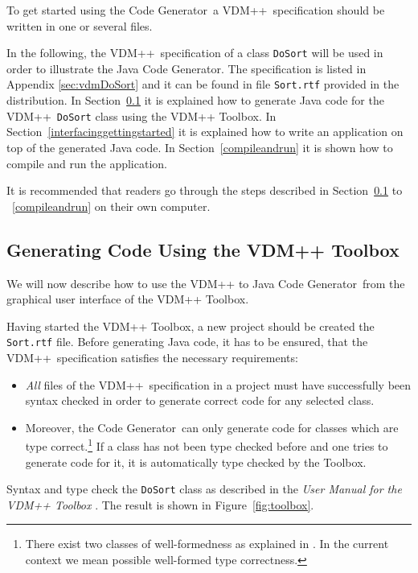 \documentclass[\pformat,11pt]{article}
\newcommand{\ToolboxName}{VDM++ Toolbox}
\newcommand{\Toolbox}{Toolbox}
\newcommand{\tcg}{the Code Generator}
\newcommand{\langmancite}{\cite{LangManPP-SCSK}}
\newcommand{\VDM}{VDM++}
\newcommand{\cg}{VDM++ to Java Code Generator}
\begin{document}
To get started using \tcg\ a \VDM\ specification should be written in
one or several files. 

In the following, the \VDM\ specification of a class {\tt DoSort} will
be used in order to illustrate the Java Code Generator.  The
specification is listed in Appendix \ref{sec:vdmDoSort} and it can be
found in file {\tt Sort.rtf} provided in the distribution. 
In Section~\ref{gui} it is explained how to generate Java code for the
\VDM\ {\tt DoSort} class using the \ToolboxName{}. In
Section~\ref{interfacinggettingstarted} it is explained how to
write an application on top of the generated Java code. In
Section~\ref{compileandrun} it is shown how to compile and run
the application. 

It is recommended that readers go through the steps described in
Section~\ref{gui} to ~\ref{compileandrun} on their own computer.

\subsection{Generating Code Using the VDM++ Toolbox}\label{gui}

We will now describe how to use the \cg\ from the graphical user
interface of the \ToolboxName{}. 

Having started the \ToolboxName{}, a new project should be created the
{\tt Sort.rtf} file. Before generating Java code, it has to be
ensured, that the \VDM\  specification satisfies the necessary
requirements: 

\begin{itemize}
\item
{\em All} files of the \VDM\ specification in a project must have
successfully been syntax checked in order to generate correct code
for any selected class.  

\item
Moreover, \tcg\ can only generate code for classes which are type
correct.\footnote{There exist two classes of well-formedness as
  explained in \langmancite. In the current context we mean possible
  well-formed type correctness.} If a class has not been type checked
before and one tries to generate code for it, it is automatically type
checked by the \Toolbox{}.  
\end{itemize}

Syntax and type check the {\tt DoSort} class as described in the {\em
  User Manual for the \VDM{} Toolbox} \cite{UserManPP-SCSK}. The
  result is shown in Figure~\ref{fig:toolbox}. 
\end{document}
